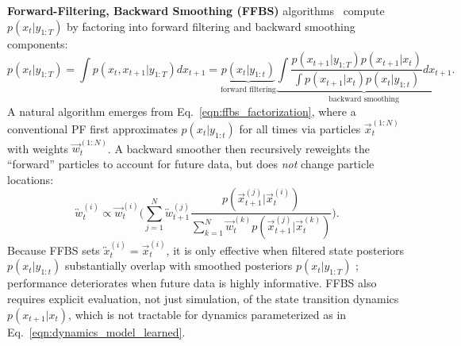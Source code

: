     \textbf{Forward-Filtering, Backward Smoothing (FFBS)} algorithms~\cite{doucet2009tutorial, Klaas2006FastPS} compute $p(x_t | y_{1:T})$ by factoring into forward filtering and backward smoothing components:
        \begin{equation}
            p(x_t | y_{1:T}) = \int p(x_{t}, x_{t+1} | y_{1:T})dx_{t+1}
                            = \underbrace{p(x_t|y_{1:t})}_{\text{forward filtering}} \underbrace{\int \frac{p(x_{t+1} | y_{1:T}) p(x_{t+1}|x_t)} {\int p(x_{t+1} | x_t) p(x_t|y_{1:t})}   dx_{t+1}}_{\text{backward smoothing}}.
            \label{eqn:ffbs_factorization}
        \end{equation}
        A natural algorithm emerges from Eq.~\eqref{eqn:ffbs_factorization}, where a conventional PF first approximates $p(x_t| y_{1:t})$ for all times via particles $\overrightarrow{x}_{t}^{(1:N)}$ with weights $\overrightarrow{w}_{t}^{(1:N)}$. A backward smoother then recursively reweights the ``forward'' particles to account for future data, but does \emph{not} change particle locations: 
        \begin{equation}
            \overleftrightarrow{w}_{t}^{(i)} \propto \overrightarrow{w}_{t}^{(i)} \Bigg( \sum_{j=1}^{N} \overleftrightarrow{w}_{t+1}^{(j)} \frac{p(\overrightarrow{x}_{t+1}^{(j)} | \overrightarrow{x}_{t}^{(i)})}{\sum_{k=1}^{N} \overrightarrow{w}_{t}^{(k)} p(\overrightarrow{x}_{t+1}^{(j)} | \overrightarrow{x}_{t}^{(k)})}\Bigg).
        \end{equation}
        Because FFBS sets $\overleftrightarrow{x}_{t}^{(i)} = \overrightarrow{x}_{t}^{(i)}$, it is only effective when filtered state posteriors $p(x_t | y_{1:t})$ substantially overlap with smoothed posteriors $p(x_t | y_{1:T})$ \cite{Klaas2006FastPS}; performance deteriorates when future data is highly informative. %
        FFBS also requires explicit evaluation, not just simulation, of the state transition dynamics $p(x_{t+1} | x_{t})$, which is not tractable for dynamics parameterized as in Eq.~\eqref{eqn:dynamics_model_learned}.  %


